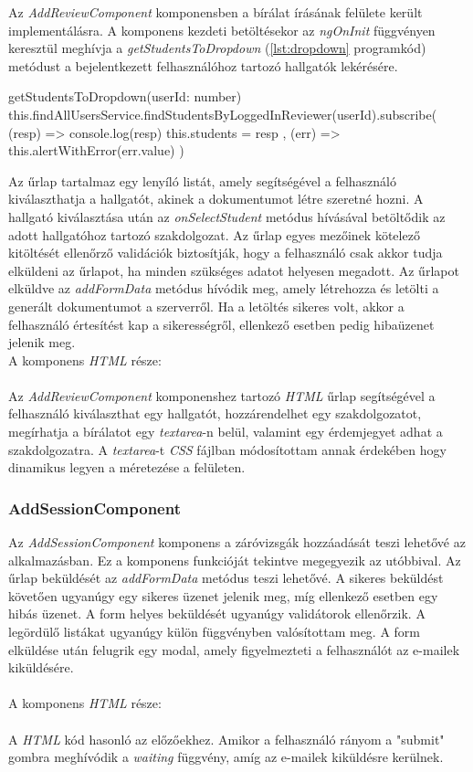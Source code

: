 Az \textit{AddReviewComponent} komponensben a bírálat írásának felülete került implementálásra. A komponens kezdeti betöltésekor az \textit{ngOnInit} függvényen keresztül meghívja a \textit{getStudentsToDropdown} (\ref{lst:dropdown} programkód) metódust a bejelentkezett felhasználóhoz tartozó hallgatók lekérésére. 
\begin{typescript}[caption={Hallgatók legördülő listába gyűjtése},captionpos=b,label={lst:dropdown}]
getStudentsToDropdown(userId: number) {
  this.findAllUsersService.findStudentsByLoggedInReviewer(userId).subscribe(
    (resp) => {
      console.log(resp)
      this.students = resp
    },
    (err) => {
      this.alertWithError(err.value)
    }
  )
}
\end{typescript}
Az űrlap tartalmaz egy lenyíló listát, amely segítségével a felhasználó kiválaszthatja a hallgatót, akinek a dokumentumot létre szeretné hozni. A hallgató kiválasztása után az \textit{onSelectStudent} metódus hívásával betöltődik az adott hallgatóhoz tartozó szakdolgozat. Az űrlap egyes mezőinek kötelező kitöltését ellenőrző validációk biztosítják, hogy a felhasználó csak akkor tudja elküldeni az űrlapot, ha minden szükséges adatot helyesen megadott. Az űrlapot elküldve az \textit{addFormData} metódus hívódik meg, amely létrehozza és letölti a generált dokumentumot a szerverről. Ha a letöltés sikeres volt, akkor a felhasználó értesítést kap a sikerességről, ellenkező esetben pedig hibaüzenet jelenik meg.\\


A komponens \textit{HTML} része:\\
\\
Az \textit{AddReviewComponent} komponenshez tartozó \textit{HTML} űrlap segítségével a felhasználó kiválaszthat egy hallgatót, hozzárendelhet egy szakdolgozatot, megírhatja a bírálatot egy \textit{textarea}-n belül, valamint  egy érdemjegyet adhat a szakdolgozatra. A \textit{textarea}-t \textit{CSS} fájlban módosítottam annak érdekében hogy dinamikus legyen a méretezése a felületen.

\subsubsection{AddSessionComponent}

Az \textit{AddSessionComponent} komponens a záróvizsgák hozzáadását teszi lehetővé az alkalmazásban. Ez a komponens funkcióját tekintve megegyezik az utóbbival. Az űrlap beküldését az \textit{addFormData} metódus teszi lehetővé. A sikeres beküldést követően ugyanúgy egy sikeres üzenet jelenik meg, míg ellenkező esetben egy hibás üzenet. A form helyes beküldését ugyanúgy validátorok ellenőrzik. A legördülő listákat ugyanúgy külön függvényben valósítottam meg. A form elküldése után felugrik egy modal, amely figyelmezteti a felhasználót az e-mailek kiküldésére.\\
\\
A komponens \textit{HTML} része:\\
\\
A \textit{HTML} kód hasonló az előzőekhez. Amikor a felhasználó rányom a "submit" gombra meghívódik a \textit{waiting} függvény, amíg az e-mailek kiküldésre kerülnek.



